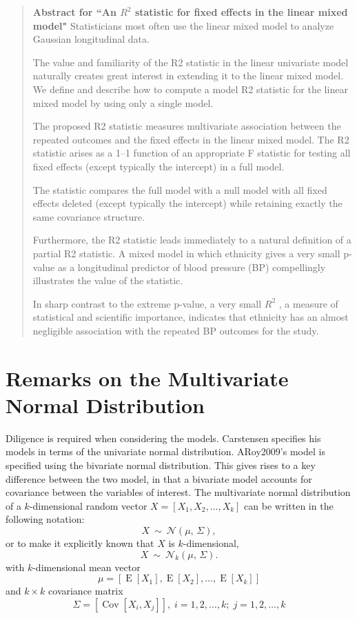 \documentclass[12pt, a4paper]{report}
\theoremstyle{plain}
\theoremstyle{definition}
\theoremstyle{remark}
\begin{document}
	\begin{framed}
		
		\begin{quote}
			\textbf{Abstract for ``An $R^2$ statistic for fixed effects in the linear mixed model"}
			Statisticians most often use the linear mixed model to analyze Gaussian longitudinal data. 
			
			The value and familiarity of the R2 statistic in the linear univariate model naturally creates great interest in extending it to the linear mixed model. We define and describe how to compute a model R2 statistic for the linear mixed model by using only a single model. 
			
			The proposed R2 statistic measures multivariate association between the repeated outcomes and the fixed effects in the linear mixed model. The R2 statistic arises as a 1–1 function of an appropriate F statistic for testing all fixed effects (except typically the intercept) in a full model. 
			
			The statistic compares the full model with a null model with all fixed effects deleted (except typically the intercept) while retaining exactly the same covariance structure. 
			
			Furthermore, the R2 statistic leads immediately to a natural definition of a partial R2 statistic. A mixed model in which ethnicity gives a very small p-value as a longitudinal predictor of blood pressure (BP) compellingly illustrates the value of the statistic. 
			
			In sharp contrast to the extreme p-value, a very small $R^2$ , a measure of statistical and scientific importance, indicates that ethnicity has an almost negligible association with the repeated BP outcomes for the study.
		\end{quote}
	\end{framed}
	
	\section{Remarks on the Multivariate Normal Distribution}
	
	Diligence is required when considering the models. Carstensen specifies his models in terms of the univariate normal distribution. ARoy2009's model is specified using the bivariate normal distribution.
	This gives rises to a key difference between the two model, in that a bivariate model accounts for covariance between the variables of interest.
	The multivariate normal distribution of a $k$-dimensional random vector $X = [X_1, X_2, \ldots, X_k]$
	can be written in the following notation:
	\[
	X\ \sim\ \mathcal{N}(\mu,\, \Sigma),
	\]
	or to make it explicitly known that $X$ is $k$-dimensional,
	\[
	X\ \sim\ \mathcal{N}_k(\mu,\, \Sigma).
	\]
	with $k$-dimensional mean vector
	\[ \mu = [ \operatorname{E}[X_1], \operatorname{E}[X_2], \ldots, \operatorname{E}[X_k]] \]
	and $k \times k$ covariance matrix
	\[ \Sigma = [\operatorname{Cov}[X_i, X_j]], \; i=1,2,\ldots,k; \; j=1,2,\ldots,k \]
	
\end{document}
